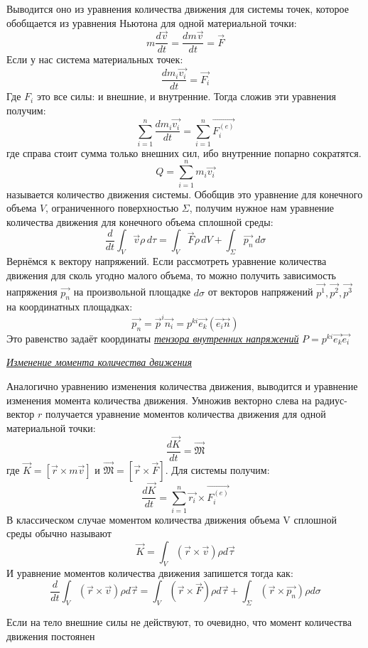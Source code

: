 Выводится оно из уравнения количества движения для системы точек, которое обобщается из уравнения Ньютона для одной материальной точки:
$$
  m \frac{d\vec{v}}{dt} = \frac{dm\vec{v}}{dt} = \vec{F}
$$
Если у нас система материальных точек:
$$
  \frac{dm_i\vec{v_i}}{dt} = \vec{F_i}
$$
Где $F_i$ это все силы: и внешние, и внутренние. Тогда сложив эти уравнения получим:
$$
  \sum_{i = 1}^{n} \frac{dm_i\vec{v_i}}{dt} = \sum_{i = 1}^{n} \vec{F^{(e)}_i}
$$
где справа стоит сумма только внешних сил, ибо внутренние попарно сократятся.
$$
  Q = \sum_{i = 1}^{n} m_i \vec{v_i}
$$
называется количество движения системы. Обобщив это уравнение для конечного объема $V$, ограниченного поверхностью $\Sigma$, получим нужное нам уравнение количества движения для конечного объема сплошной среды:
$$
  \frac{d}{dt}  \int_{V} \vec{v} \rho \,d\tau =  \int_{V} \vec{F} \rho \,dV  + \int_{\Sigma} \vec{p_n} \,d\sigma
$$
Вернёмся к вектору напряжений. Если рассмотреть уравнение количества движения для сколь угодно малого объема, то можно получить зависимость напряжения $\vec{p_n}$ на произвольной площадке $d\sigma$ от векторов напряжений $\vec{p^1}, \vec{p^2}, \vec{p^3}$ на координатных площадках:
$$
  \vec{p_n} = \vec{p}^i\vec{n_i} = p^{ki}\vec{e_k}(\vec{e_i}\vec{n})
$$
Это равенство задаёт координаты \textit{\underline{тензора внутренних напряжений}} $P = p^{ki}\vec{e_k}\vec{e_i}$

\begin{center}
  \textit{\underline{Изменение момента количества движения}}
\end{center}
Аналогично уравнению изменения количества движения, выводится и уравнение изменения момента количества движения.
Умножив векторно слева на радиус-вектор $r$ получается уравнение моментов количества движения для одной материальной точки:
$$
  \frac{d\vec{K}}{dt} = \vec{\mathfrak{M}}
$$
где $\vec{K} = [\vec{r} \times m\vec{v}]$ и $\vec{\mathfrak{M}} = [\vec{r} \times \vec{F}]$. Для системы получим:
$$
  \frac{d\vec{K}}{dt} = \sum_{i=1}^{n}\vec{r_i}\times\vec{F_i^{(e)}}
$$
В классическом случае моментом количества движения объема V сплошной среды обычно называют
$$
  \vec{K} = \int_{V} (\vec{r} \times \vec{v}) \rho d \vec{\tau}
$$
И уравнение моментов количества движения запишется тогда как:
$$
  \frac{d}{dt} \int_{V} (\vec{r} \times \vec{v}) \rho d\vec{\tau} = \int_{V} (\vec{r} \times \vec{F}) \rho d\vec{\tau} + \int_{\Sigma} (\vec{r} \times \vec{p_n}) \rho d\sigma
$$

Если на тело внешние силы не действуют, то очевидно, что момент количества движения постоянен

